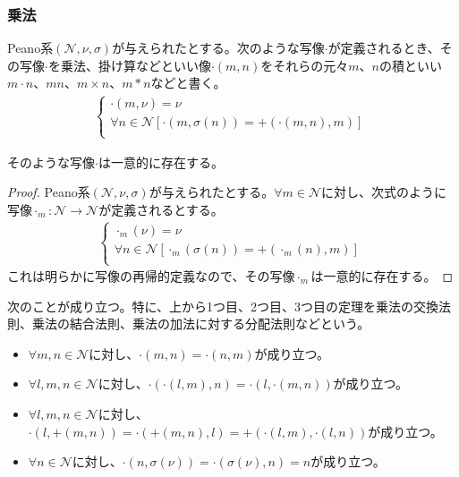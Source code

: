 \documentclass[dvipdfmx]{jsarticle}
\begin{document}
\subsubsection{乗法}%
\begin{dfn}
Peano系$\left( \mathcal{N,}\nu,\sigma \right)$が与えられたとする。次のような写像$\cdot$が定義されるとき、その写像$\cdot$を乗法、掛け算などといい像$\cdot (m,n)$をそれらの元々$m$、$n$の積といい$m \cdot n$、$mn$、$m \times n$、$m*n$などと書く。
\begin{align*}
\left\{ \begin{matrix}
 \cdot (m,\nu) = \nu \\
\forall n \in \mathcal{N}\left[ \cdot \left( m,\sigma(n) \right) = + \left( \cdot (m,n),m \right) \right] \\
\end{matrix} \right.\ 
\end{align*}
\end{dfn}
\begin{thm}\label{1.2.4.13}
そのような写像$\cdot$は一意的に存在する。
\end{thm}
\begin{proof}
Peano系$\left( \mathcal{N,}\nu,\sigma \right)$が与えられたとする。$\forall m \in \mathcal{N}$に対し、次式のように写像$\cdot_{m}\mathcal{:N \rightarrow N}$が定義されるとする。
\begin{align*}
\left\{ \begin{matrix}
 \cdot_{m}(\nu) = \nu \\
\forall n \in \mathcal{N}\left[ \cdot_{m}\left( \sigma(n) \right) = + \left( \cdot_{m}(n),m \right) \right] \\
\end{matrix} \right.\ 
\end{align*}
これは明らかに写像の再帰的定義なので、その写像$\cdot_{m}$は一意的に存在する。
\end{proof}
\begin{thm}\label{1.2.4.14}
次のことが成り立つ。特に、上から1つ目、2つ目、3つ目の定理を乗法の交換法則、乗法の結合法則、乗法の加法に対する分配法則などという。
\begin{itemize}
\item
  $\forall m,n \in \mathcal{N}$に対し、$\cdot (m,n) = \cdot (n,m)$が成り立つ。
\item
  $\forall l,m,n \in \mathcal{N}$に対し、$\cdot \left( \cdot (l,m),n \right) = \cdot \left( l, \cdot (m,n) \right)$が成り立つ。
\item
  $\forall l,m,n \in \mathcal{N}$に対し、$\cdot \left( l, + (m,n) \right) = \cdot \left( + (m,n),l \right) = + \left( \cdot (l,m), \cdot (l,n) \right)$が成り立つ。
\item
  $\forall n \in \mathcal{N}$に対し、$\cdot \left( n,\sigma(\nu) \right) = \cdot \left( \sigma(\nu),n \right) = n$が成り立つ。
\end{itemize}
\end{thm}
\end{document}
